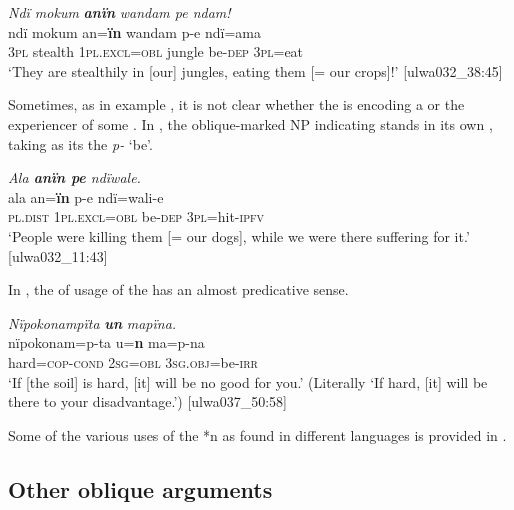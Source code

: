 \ea%
    \label{ex:clause:81}
          \textit{Ndï mokum} \textbf{\textit{anïn}} \textit{wandam pe ndam!}\\
\gll    ndï  mokum  an=\textbf{ïn}        wandam  p-e    ndï=ama\\
    3\textsc{pl}  stealth    1\textsc{pl.excl=obl}  jungle    be\textsc{{}-dep} 3\textsc{pl}=eat\\
\glt `They are stealthily in [our] jungles, eating them [= our crops]!’ [ulwa032\_38:45]
\z

Sometimes, as in example , it is not clear whether the  is encoding a  or the experiencer of some . In , the oblique-marked NP indicating  stands in its own , taking as its  the  \textit{p-} ‘be’.

\ea%
    \label{ex:clause:82}
          \textit{Ala \textbf{anïn pe} ndïwale.}\\
\gll    ala      an=\textbf{ïn}        p-e      ndï=wali{}-e\\
    \textsc{pl.dist}  1\textsc{pl.excl=obl}  be\textsc{{}-dep} 3\textsc{pl}=hit-\textsc{ipfv}\\
\glt `People were killing them [= our dogs], while we were there suffering for it.’ [ulwa032\_11:43]
\z

In , the  of  usage of the  has an almost predicative sense.

\ea%
    \label{ex:clause:83}
          \textit{Nïpokonampïta} \textbf{\textit{un}} \textit{mapïna.}\\
\gll    nïpokonam=p-ta  u=\textbf{n}    ma=p-na\\
    hard=\textsc{cop{}-cond} 2\textsc{sg=obl}  3\textsc{sg.obj}=be-\textsc{irr}\\
\glt `If [the soil] is hard, [it] will be no good for you.’ (Literally ‘If hard, [it] will be there to your disadvantage.’) [ulwa037\_50:58]
\z

Some of the various uses of the  *n as found in different  languages is provided in \citet[54--55]{KillianBarlow2022}.


\subsection{Other oblique arguments}\label{sec:11.4.3}

